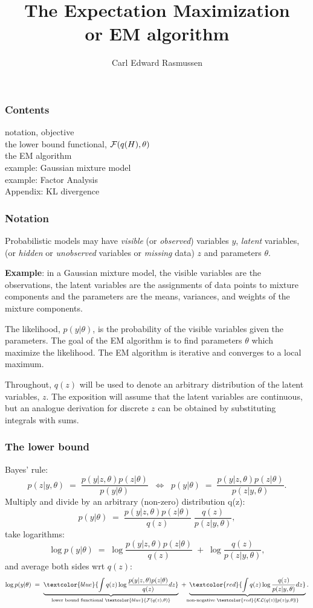 \documentclass[10pt]{beamer}
\title[The EM algorithm]{The Expectation Maximization\\ or EM algorithm}
\author{Carl Edward Rasmussen}
\newcommand{\Red}{\textcolor{red}}
\newcommand{\Blue}{\textcolor{blue}}
\newcommand{\y}{y}
\newcommand{\z}{z}
\begin{document}
\begin{frame}
\titlepage

\end{frame}

\begin{frame}
\frametitle{Contents}
notation, objective\\
the lower bound functional, ${\cal F}(q(H),\theta)$\\
the EM algorithm\\
example: Gaussian mixture model\\
example: Factor Analysis\\
Appendix: KL divergence
\end{frame}

\begin{frame}
\frametitle{Notation}

Probabilistic models may have \emph{visible} (or \emph{observed}) variables $\y$, \emph{latent} variables, (or \emph{hidden} or \emph{unobserved}  variables or \emph{missing} data) $\z$ and parameters $\theta$.

{\bf Example}: in a Gaussian mixture model, the visible variables are the observations, the latent variables are the assignments of data points to mixture components and the parameters are the means, variances, and weights of the mixture components.

The likelihood, $p(\y|\theta)$, is the probability of the visible variables given the parameters. The goal of the EM algorithm is to find parameters $\theta$ which maximize the likelihood. The EM algorithm is iterative and converges to a local maximum.

Throughout, $q(\z)$ will be used to denote an arbitrary distribution of the latent variables, $\z$. The exposition will assume that the latent variables are continuous, but an analogue derivation for discrete $\z$ can be obtained by substituting integrals with sums.
\end{frame}

\begin{frame}
\frametitle{The lower bound}

Bayes' rule:
\[
p(\z|\y,\theta)\;=\;\frac{p(\y|\z,\theta)p(\z|\theta)}{p(\y|\theta)}\;\;\Leftrightarrow\;\;
p(\y|\theta)\;=\;\frac{p(\y|\z,\theta)p(\z|\theta)}{p(\z|\y,\theta)}.
\]
Multiply and divide by an arbitrary (non-zero) distribution q(\z):
\[
p(\y|\theta)\;=\;\frac{p(\y|\z,\theta)p(\z|\theta)}{q(\z)}\;\frac{q(\z)}{p(\z|\y,\theta)},
\]
take logarithms:
\[
\log p(\y|\theta)\;=\;\log\frac{p(\y|\z,\theta)p(\z|\theta)}{q(\z)}\;+\;\log\frac{q(\z)}{p(\z|\y,\theta)},
\] 
and average both sides wrt $q(\z)$:
\[
\log p(\y|\theta)\;=\;\underbrace{\Blue{\int q(\z)\log\frac{p(\y|\z,\theta)p(\z|\theta)}{q(\z)}d\z}}_{\text{lower bound functional\ }\Blue{{\cal F}(q(\z),\theta)}}\;+\;
\underbrace{\Red{\int q(\z)\log\frac{q(\z)}{p(\z|\y,\theta)}d\z}}_{\!\!\!\!\!\!\!\!\!\!\!\text{non-negative\ }\Red{{\cal KL}(q(\z)|\!|p(\z|\y,\theta)\!)}}.
\]
\end{frame}
\end{document}
